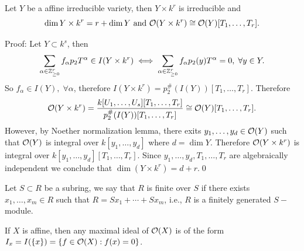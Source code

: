\begin{dang}
    \begin{lemma}
        Let $Y$ be a affine irreducible variety, then $Y\times k^r$ is irreducible and 
        \begin{equation}
            \dim Y\times k^r = r+\dim Y\text{ and }\mathcal{O}(Y\times k^r)\cong\mathcal{O}(Y)[T_1,\dots,T_r].
        \end{equation}
    \end{lemma}
\end{dang}
Proof: Let $Y\subset k^s$, then  
\begin{equation}
    \sum_{\alpha\in\mathbb{Z}_{\geq0}^r}f_\alpha p_2 T^\alpha\in I(Y\times k^r)\iff 
   \sum_{\alpha\in\mathbb{Z}_{\geq0}^r}f_\alpha p_2(y) T^\alpha = 0,\;\forall y\in Y.
\end{equation}
So $f_\alpha\in I(Y),\;\forall\alpha$, therefore $I(Y\times k^r) = p_2^\#(I(Y))[T_1,\dots, T_r]$.
Therefore 
\begin{equation}
    \mathcal{O}(Y\times k^r)=\frac{k[U_1,\dots, U_s][T_1,\dots, T_r]}{p_2^\#(I(Y))[T_1,\dots,T_r]}
    \cong \mathcal{O}(Y)[T_1,\dots,T_r].
\end{equation}
However, by Noether normalization lemma, there exits $y_1,\dots, y_d\in\mathcal{O}(Y)$ such that 
$\mathcal{O}(Y)$ is integral over $k[y_1,\dots, y_d]$ where $d=\dim Y$. Therefore 
$\mathcal{O}(Y\times k^r)$ is integral over $k[y_1,\dots, y_d][T_1,\dots, T_r]$. Since 
$y_1,\dots, y_d, T_1,\dots, T_r$ are algebraically independent we conclude that 
$\dim (Y\times k^r)= d + r$.\qed

\begin{remark}
    Let $S\subset R$ be a subring, we say that $R$ is finite over $S$ if there exists $x_1,\dots, x_m\in R$ such that 
    $R=Sx_1+\cdots+Sx_m$, i.e., $R$ is a finitely generated $S-$module.
\end{remark}
\begin{remark}
   If $X$ is affine, then any maximal ideal of $\mathcal{O}(X)$ is of the form $I_x=I(\{x\})=\{f\in\mathcal{O}(X):f(x)=0\}$.
\end{remark}

